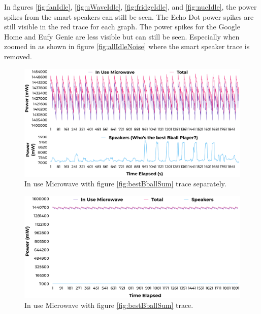 In figures \ref{fig:fanIdle}, \ref{fig:uWaveIdle}, \ref{fig:fridgeIdle}, and \ref{fig:nucIdle}, the power spikes from the smart speakers can still be seen. The Echo Dot power spikes are still visible in the red trace for each graph. The power spikes for the Google Home and Eufy Genie are less visible but can still be seen. Especially when zoomed in as shown in figure \ref{fig:allIdleNoise} where the smart speaker trace is removed.

\begin{figure}[H]
  \centering
  \includegraphics[width=1\textwidth]{figures/inUseuWaveNoiseSeperate.png}
  \caption{In use Microwave with figure \ref{fig:bestBballSum} trace separately.}
  \label{fig:uWaveInUseSeperate}
\end{figure}

\begin{figure}[H]
  \centering
  \includegraphics[width=1\textwidth]{figures/inUseuWaveNoise.png}
  \caption{In use Microwave with figure \ref{fig:bestBballSum} trace.}
  \label{fig:uWaveInUse}
\end{figure}

